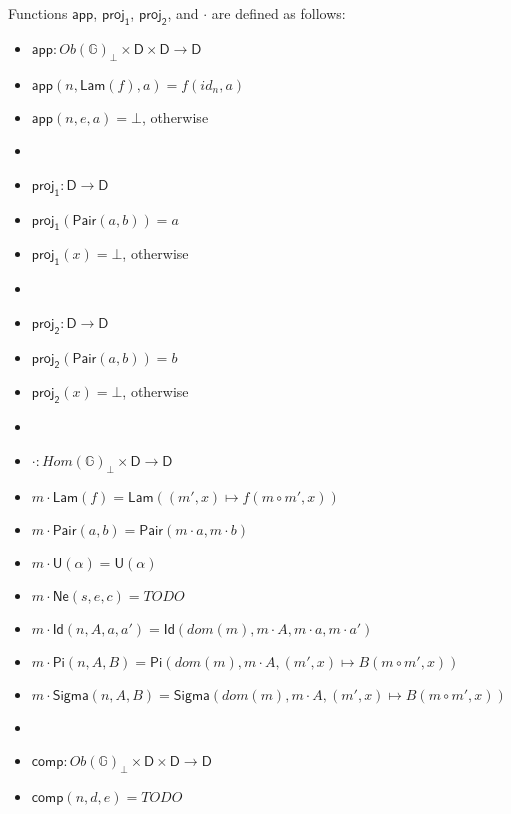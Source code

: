 \documentclass{amsart}
\theoremstyle{definition}
\theoremstyle{remark}
\newcommand{\D}{\mathsf{D}}
\newcommand{\bbG}{\mathbb{G}}
\numberwithin{table}{section}
\begin{document}
Functions $\mathsf{app}$, $\mathsf{proj_1}$, $\mathsf{proj_2}$, and $\cdot$ are defined as follows:
\begin{itemize}
\item[] $\mathsf{app} : Ob(\bbG)_\bot \times \D \times \D \to \D$
\item[] $\mathsf{app}(n,\mathsf{Lam}(f),a) = f(id_n,a)$
\item[] $\mathsf{app}(n,e,a) = \bot$, otherwise
\item[]
\item[] $\mathsf{proj_1} : \D \to \D$
\item[] $\mathsf{proj_1}(\mathsf{Pair}(a,b)) = a$
\item[] $\mathsf{proj_1}(x) = \bot$, otherwise
\item[]
\item[] $\mathsf{proj_2} : \D \to \D$
\item[] $\mathsf{proj_2}(\mathsf{Pair}(a,b)) = b$
\item[] $\mathsf{proj_2}(x) = \bot$, otherwise
\item[]
\item[] $\cdot : Hom(\bbG)_\bot \times \D \to \D$
\item[] $m \cdot \mathsf{Lam}(f) = \mathsf{Lam}((m',x) \mapsto f(m \circ m', x))$
\item[] $m \cdot \mathsf{Pair}(a, b) = \mathsf{Pair}(m \cdot a, m \cdot b)$
\item[] $m \cdot \mathsf{U}(\alpha) = \mathsf{U}(\alpha)$
\item[] $m \cdot \mathsf{Ne}(s,e,c) = TODO$
\item[] $m \cdot \mathsf{Id}(n, A, a, a') = \mathsf{Id}(dom(m), m \cdot A, m \cdot a, m \cdot a')$
\item[] $m \cdot \mathsf{Pi}(n, A, B) = \mathsf{Pi}(dom(m), m \cdot A, (m', x) \mapsto B(m \circ m', x))$
\item[] $m \cdot \mathsf{Sigma}(n, A, B) = \mathsf{Sigma}(dom(m), m \cdot A, (m', x) \mapsto B(m \circ m', x))$
\item[]
\item[] $\mathsf{comp} : Ob(\bbG)_\bot \times \D \times \D \to \D$
\item[] $\mathsf{comp}(n, d, e) = TODO$
\end{itemize}
\end{document}
